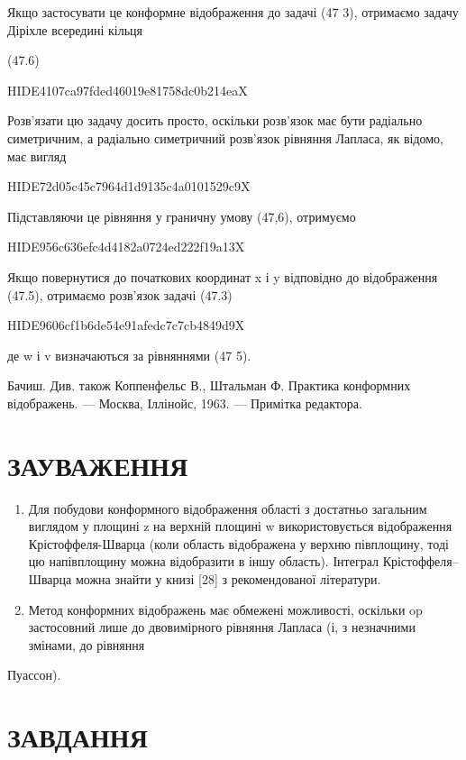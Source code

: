 \documentclass[
  ukrainian,
]{article}
\begin{document}
Якщо застосувати це конформне відображення до задачі (47 3), отримаємо
задачу Діріхле всередині кільця

(47.6)

HIDE4107ca97fded46019e81758dc0b214eaX

Розв'язати цю задачу досить просто, оскільки розв'язок має бути
радіально симетричним, а радіально симетричний розв'язок рівняння
Лапласа, як відомо, має вигляд

HIDE72d05c45c7964d1d9135c4a0101529c9X

Підставляючи це рівняння у граничну умову (47,6), отримуємо

HIDE956c636efc4d4182a0724ed222f19a13X

Якщо повернутися до початкових координат x і y відповідно до
відображення (47.5), отримаємо розв'язок задачі (47.3)

HIDE9606cf1b6de54e91afedc7c7cb4849d9X

де w і v визначаються за рівняннями (47 5).

Бачиш. Див. також Коппенфельс В., Штальман Ф. Практика конформних
відображень. --- Москва, Іллінойс, 1963. --- Примітка редактора.

\section{ЗАУВАЖЕННЯ}\label{ux437ux430ux443ux432ux430ux436ux435ux43dux43dux44f-3}

\begin{enumerate}
\def\labelenumi{\arabic{enumi}.}
\item
  Для побудови конформного відображення області з достатньо загальним
  виглядом у площині z на верхній площині w використовується
  відображення Крістоффеля-Шварца (коли область відображена у верхню
  півплощину, тоді цю напівплощину можна відобразити в іншу область).
  Інтеграл Крістоффеля--Шварца можна знайти у книзі {[}28{]} з
  рекомендованої літератури.
\item
  Метод конформних відображень має обмежені можливості, оскільки op
  застосовний лише до двовимірного рівняння Лапласа (і, з незначними
  змінами, до рівняння
\end{enumerate}

Пуассон).

\section{ЗАВДАННЯ}\label{ux437ux430ux432ux434ux430ux43dux43dux44f-6}
\end{document}
